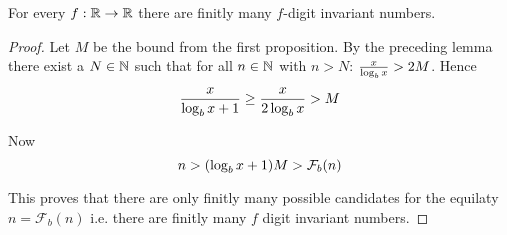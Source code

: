 \begin{theorem}
	For every $f : \mathbb{R} \rightarrow \mathbb{R}$ there are finitly many $f$-digit
	invariant numbers.
\end{theorem}

\begin{proof}
	Let $M$ be the bound from the first proposition. By the preceding lemma 
	there exist a $N \in \mathbb{N}$ such that for all $n \in \mathbb{N}$ with $n \gt N$:
	$\frac{x}{\log_{b}{x}} > 2M$. Hence
	\[
		\frac{x}{\log_{b}{x} + 1} \ge \frac{x}{2\log_{b}{x}} > M
	\]
	
	Now
	\[
		n > (\log_{b}{x} + 1) M > \mathcal{F}_{b} (n)
	\]
	
	This proves that there are only finitly many possible candidates for the
	equilaty $n = \mathcal{F}_{b}(n)$ i.e. there are finitly many $f$ digit
	invariant numbers.
\end{proof}
